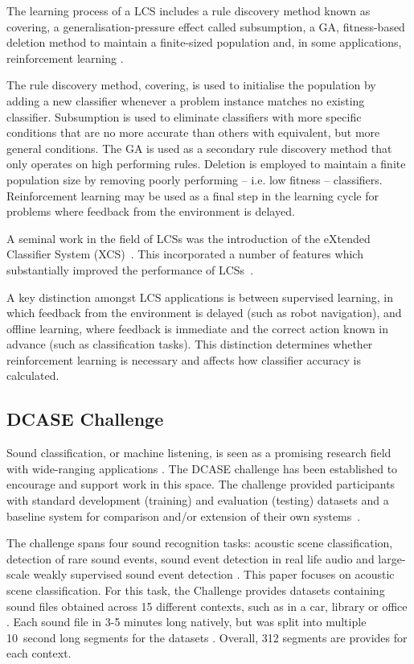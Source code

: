 \documentclass[11pt]{article}
\begin{document}
The learning process of a LCS includes a rule discovery method known as covering, a generalisation-pressure effect called subsumption, a GA, fitness-based deletion method to maintain a finite-sized population and, in some applications, reinforcement learning \cite{Butz2000}.

The rule discovery method, covering, is used to initialise the population by adding a new classifier whenever a problem instance matches no existing classifier. Subsumption is used to eliminate classifiers with more specific conditions that are no more accurate than others with equivalent, but more general conditions. The GA is used as a secondary rule discovery method that only operates on high performing rules. Deletion is employed to maintain a finite population size by removing poorly performing -- i.e. low fitness -- classifiers. Reinforcement learning may be used as a final step in the learning cycle for problems where feedback from the environment is delayed.

A seminal work in the field of LCSs was the introduction of the eXtended Classifier System (XCS)~\cite{Lanzi2008,Sigaud2007}. This incorporated a number of features which substantially improved the performance of LCSs~\cite{Lanzi2008}.

A key distinction amongst LCS applications is between supervised learning, in which feedback from the environment is delayed (such as robot navigation), and offline learning, where feedback is immediate and the correct action known in advance (such as classification tasks). This distinction determines whether reinforcement learning is necessary and affects how classifier accuracy is calculated.

\subsection{DCASE Challenge}
\label{sec:DCASE}

Sound classification, or machine listening, is seen as a promising research field with wide-ranging applications \cite{Mesaros2017}. The DCASE challenge has been established to encourage and support work in this space. The challenge provided participants with standard development (training) and evaluation (testing) datasets \cite{Mesaros2016} and a baseline system for comparison and/or extension of their own systems~\cite{Mesaros2017,DCASE2017asc}.

The challenge spans four sound recognition tasks: acoustic scene classification, detection of rare sound events, sound event detection in real life audio and large-scale weakly supervised sound event detection \cite{Mesaros2017}. This paper focuses on acoustic scene classification. For this task, the Challenge provides datasets containing sound files obtained across 15 different contexts, such as in a car, library or office \cite{DCASE2017asc}. Each sound file in 3-5 minutes long natively, but was split into multiple 10~second long segments for the datasets \cite{DCASE2017asc}. Overall, 312 segments are provides for each context.
\end{document}
